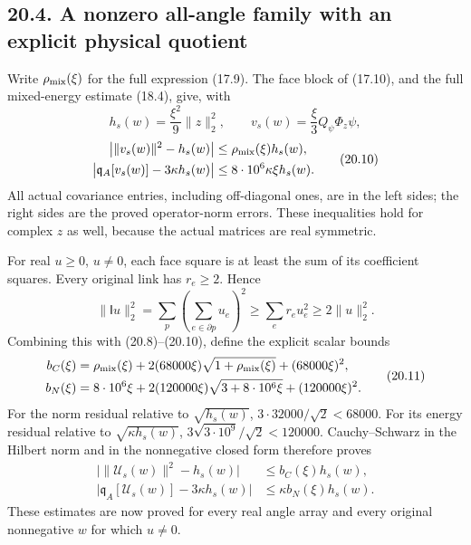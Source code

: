 \documentclass[
]{article}
\begin{document}
\subsection{20.4. A nonzero all-angle family with an explicit physical
quotient}\label{a-nonzero-all-angle-family-with-an-explicit-physical-quotient}

Write \(\rho_{\rm mix}(\xi)\) for the full expression (17.9). The face
block of (17.10), and the full mixed-energy estimate (18.4), give, with
\[
h_s(w)=\frac{\xi^2}{9}\|z\|_2^2,\qquad
v_s(w)=\frac{\xi}{3}Q_\psi\Phi_z\psi,
\] \[
\begin{aligned}
\big|\|v_s(w)\|^2-h_s(w)\big|&\le\rho_{\rm mix}(\xi)h_s(w),\\
\big|\mathfrak q_A[v_s(w)]-3\kappa h_s(w)\big|
 &\le8\cdot10^6\kappa\xi h_s(w).
\end{aligned}                                                   \tag{20.10}
\] All actual covariance entries, including off-diagonal ones, are in
the left sides; the right sides are the proved operator-norm errors.
These inequalities hold for complex \(z\) as well, because the actual
matrices are real symmetric.

For real \(u\ge0\), \(u\ne0\), each face square is at least the sum of
its coefficient squares. Every original link has \(r_e\ge2\). Hence \[
\|\mathsf Iu\|_2^2
 =\sum_p\left(\sum_{e\in\partial p}u_e\right)^2
 \ge\sum_e r_eu_e^2\ge2\|u\|_2^2 .
\] Combining this with (20.8)--(20.10), define the explicit scalar
bounds \[
\begin{aligned}
b_C(\xi)&=\rho_{\rm mix}(\xi)
 +2(68000\xi)\sqrt{1+\rho_{\rm mix}(\xi)}+(68000\xi)^2,\\
b_N(\xi)&=8\cdot10^6\xi
 +2(120000\xi)\sqrt{3+8\cdot10^6\xi}+(120000\xi)^2 .
\end{aligned}                                                   \tag{20.11}
\] For the norm residual relative to \(\sqrt{h_s(w)}\),
\(3\cdot32000/\sqrt2<68000\). For its energy residual relative to
\(\sqrt{\kappa h_s(w)}\), \(3\sqrt{3\cdot10^9}/\sqrt2<120000\).
Cauchy--Schwarz in the Hilbert norm and in the nonnegative closed form
therefore proves \[
\begin{aligned}
\big|\|\mathcal U_s(w)\|^2-h_s(w)\big|&\le b_C(\xi)h_s(w),\\
\big|\mathfrak q_A[\mathcal U_s(w)]-3\kappa h_s(w)\big|
 &\le\kappa b_N(\xi)h_s(w).
\end{aligned}                                                   \tag{20.12}
\] These estimates are now proved for every real angle array and every
original nonnegative \(w\) for which \(u\ne0\).
\end{document}
